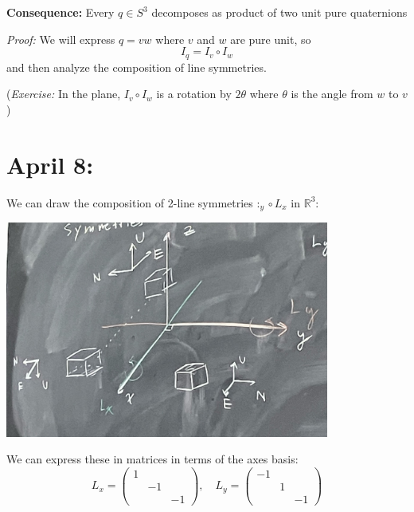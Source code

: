 \documentclass[12pt]{article}
\newcommand{\R}{\mathbb{R}}
\newenvironment*{tbox}[2][gray]{
    \begin{tcolorbox}[
        parbox=false,
        colback=#1!5!white,
        colframe=#1!75!black,
        breakable,
        title={#2}
    ]}
    {\end{tcolorbox}}
\begin{document}
    \textbf{Consequence:} Every $q \in S^3$ decomposes as product of two unit pure quaternions 

    \begin{tbox}{\textbf{Theorem:} Let $q$ be a unit quaternion such that $q = \cos \frac{\theta}{2} + \sin \frac{\theta}{2} u$ with $u$ pure unit. Then the map $I_q$ is a rotation about $\R u$ by angle of $\theta$ (clockwise)} 
        \emph{Proof:} We will express $q = vw$ where $v$ and $w$ are pure unit, so 
        \[I_q = I_v \circ I_w\] 
        and then analyze the composition of line symmetries. 

        (\emph{Exercise:} In the plane, $I_v \circ I_w$ is a rotation by $2\theta$ where $\theta$ is the angle from $w$ to $v$) 
    \end{tbox}

\section{April 8:}
    We can draw the composition of 2-line symmetries $:_y \circ L_x$ in $\R^3$: 
    \begin{center}
        \includegraphics[width=0.8\textwidth]{Images/Cube symmetries.png}
    \end{center}

    We can express these in matrices in terms of the axes basis: 
    \[L_x = \begin{pmatrix}
        1\\ 
        & -1\\ 
        & & -1 
    \end{pmatrix}, \quad L_y = \begin{pmatrix}
        -1\\ 
        & 1\\ 
        & & -1
    \end{pmatrix}\]
\end{document}
